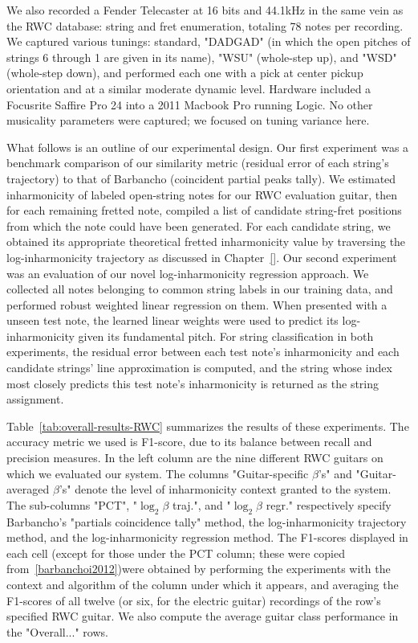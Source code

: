 \documentclass[12pt]{cmuthesis}
\begin{document}
We also recorded a Fender Telecaster at 16 bits and 44.1kHz in the same vein as the RWC database: string and fret enumeration, totaling 78 notes per recording. We captured various tunings: standard, "DADGAD" (in which the open pitches of strings 6 through 1 are given in its name), "WSU" (whole-step up), and "WSD" (whole-step down), and performed each one with a pick at center pickup orientation and at a similar moderate dynamic level. Hardware included a Focusrite Saffire Pro 24 into a 2011 Macbook Pro running Logic. No other musicality parameters were captured; we focused on tuning variance here.

What follows is an outline of our experimental design. Our first experiment was a benchmark comparison of our similarity metric (residual error of each string's trajectory) to that of Barbancho (coincident partial peaks tally). We estimated inharmonicity of labeled open-string notes for our RWC evaluation guitar, then for each remaining fretted note, compiled a list of candidate string-fret positions from which the note could have been generated. For each candidate string, we obtained its appropriate theoretical fretted inharmonicity value by traversing the log-inharmonicity trajectory as discussed in Chapter~\ref{}. Our second experiment was an evaluation of our novel log-inharmonicity regression approach. We collected all notes belonging to common string labels in our training data, and performed robust weighted linear regression on them. When presented with a unseen test note, the learned linear weights were used to predict its log-inharmonicity given its fundamental pitch. For string classification in both experiments, the residual error between each test note's inharmonicity and each candidate strings' line approximation is computed, and the string whose index most closely predicts this test note's inharmonicity is returned as the string assignment.

Table~\ref{tab:overall-results-RWC} summarizes the results of these experiments. The accuracy metric we used is F1-score, due to its balance between recall and precision measures. In the left column are the nine different RWC guitars on which we evaluated our system. The columns "Guitar-specific $\beta$'s" and "Guitar-averaged $\beta$'s" denote the level of inharmonicity context granted to the system. The sub-columns "PCT", "$\log_2\beta $ traj.", and "$\log_2\beta$ regr." respectively specify Barbancho's "partials coincidence tally" method, the log-inharmonicity trajectory method, and the log-inharmonicity regression method. The F1-scores displayed in each cell (except for those under the PCT column; these were copied from~\ref{barbanchoi2012})were obtained by performing the experiments with the context and algorithm of the column under which it appears, and averaging the F1-scores of all twelve (or six, for the electric guitar) recordings of the row's specified RWC guitar. We also compute the average guitar class performance in the "Overall..." rows.
\end{document}
